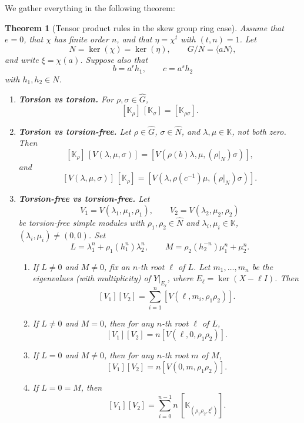 \documentclass[11pt, twoside]{amsart}
\newtheorem{theorem}{Theorem}[section]
\theoremstyle{definition}
\begin{document}
We gather everything in the following theorem:
%
\begin{theorem}[Tensor product rules in the skew group ring case]
Assume that \(e=0\), that \(\chi\) has finite order \(n\), and that
\(\eta=\chi^{t}\) with \((t,n)=1\). Let
%
\[N=\ker(\chi)=\ker(\eta),\qquad G/N=\langle aN\rangle, \]
%
and write \(\xi=\chi(a)\). Suppose also that
%
\[b=a^r h_1,\qquad c=a^s h_2\]
%
with \(h_1,h_2\in N\).

\begin{enumerate}

\item \textbf{Torsion vs torsion.}
For \(\rho,\sigma\in\widehat{G}\),
%
\[[\mathbb K_\rho]\,[\mathbb K_\sigma] = [\mathbb K_{\rho\sigma}].\]

\item \textbf{Torsion vs torsion-free.}
Let \(\rho\in\widehat{G}\), \(\sigma\in\widehat{N}\), and
\(\lambda,\mu\in\mathbb K\), not both zero. Then
%
\[[\mathbb K_\rho]\,[V(\lambda,\mu,\sigma)] = [V(\rho(b)\lambda,\mu,(\rho|_N)\sigma)],\]
%
and
%
\[[V(\lambda,\mu,\sigma)]\,[\mathbb K_\rho] = [V(\lambda,\rho(c^{-1})\mu,(\rho|_N)\sigma)].\]

\item \textbf{Torsion-free vs torsion-free.}
Let
%
\[V_1=V(\lambda_1,\mu_1,\rho_1),\qquad V_2=V(\lambda_2,\mu_2,\rho_2)\]
%
be torsion-free simple modules with \(\rho_1,\rho_2\in\widehat{N}\) and
\(\lambda_i,\mu_i\in\mathbb K\), \((\lambda_i,\mu_i)\neq(0,0)\). Set
%
\[L=\lambda_1^n+\rho_1(h_1^n)\lambda_2^n, \qquad M=\rho_2(h_2^{-n})\mu_1^n+\mu_2^n.\]

\begin{enumerate}
    \item If \(L\neq 0\) and \(M\neq 0\), fix an \(n\)-th root \(\ell\) of \(L\).
    Let \(m_1,\ldots,m_n\) be the eigenvalues (with multiplicity) of
    \(Y|_{E_\ell}\), where \(E_\ell=\ker(X-\ell I)\). Then
    \[[V_1][V_2] = \sum_{i=1}^n [V(\ell,m_i,\rho_1\rho_2)].\]

    \item If \(L\neq 0\) and \(M=0\), then for any \(n\)-th root \(\ell\) of \(L\),
    \[[V_1][V_2] = n[V(\ell,0,\rho_1\rho_2)].\]

    \item If \(L=0\) and \(M\neq 0\), then for any \(n\)-th root \(m\) of \(M\),
    \[[V_1][V_2] = n[V(0,m,\rho_1\rho_2)].\]

    \item If \(L=0=M\), then
    \[    [V_1][V_2]  = \sum_{i=0}^{n-1} n\,[\mathbb K_{(\rho_1\rho_2,\xi^i)}].\]
\end{enumerate}
\end{enumerate}
\end{theorem}
\end{document}
